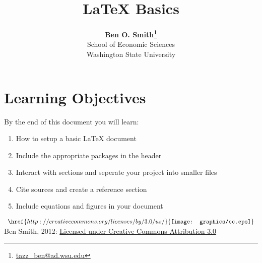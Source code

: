 \documentclass[11pt]{article}
\begin{document}
 

\title{LaTeX Basics}
\date{}
\author{\textbf{Ben O. Smith\footnote{\href{mailto:tazz_ben@ad.wsu.edu}{tazz\_ben@ad.wsu.edu}}} \\
School of Economic Sciences \\
Washington State University}
\maketitle 

\section*{Learning Objectives}

By the end of this document you will learn:

\begin{enumerate}
	\item How to setup a basic LaTeX document
	\item Include the appropriate packages in the header
	\item Interact with sections and seperate your project into smaller files
	\item Cite sources and create a reference section
	\item Include equations and figures in your document
\end{enumerate}

\doublespace







\printbibliography[title=Bibliography]
\vspace{\fill}
\noindent $ \begin{array}{l} \href{http://creativecommons.org/licenses/by/3.0/us/}{\texttt{[image: graphics/cc.eps]}} \end{array} $ Ben Smith, 2012: \href{http://creativecommons.org/licenses/by/3.0/us/}{Licensed under Creative Commons Attribution 3.0}
\end{document}
